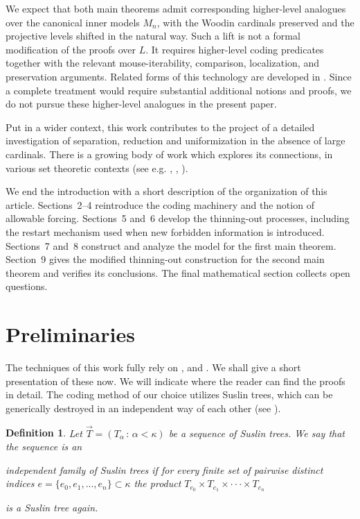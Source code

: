 \documentclass[a4paper,11pt]{article}
\newtheorem{definition}[theorem]{Definition}
\begin{document}
We expect that both main theorems admit corresponding higher-level analogues over the canonical inner models $M_n$, with the Woodin cardinals preserved and the projective levels shifted in the natural way. Such a lift is not a formal modification of the proofs over $L$. It requires higher-level coding predicates together with the relevant mouse-iterability, comparison, localization, and preservation arguments. Related forms of this technology are developed in \cite{Uniformization,DelfinoSigma,DelfinoPi}. Since a complete treatment would require substantial additional notions and proofs, we do not pursue these higher-level analogues in the present paper.

Put in a wider context, this work contributes to the project of a detailed investigation of separation, reduction and uniformization in the absence of large cardinals. There is a growing body of work which explores its connections, in various set theoretic contexts (see e.g. \cite{Separation without reduction}, \cite{Forcing axioms and uniformization}, \cite{MA and failure of separation}). 


We end the introduction with a short description of the organization of this article. Sections~2--4 reintroduce the coding machinery and the notion of allowable forcing. Sections~5 and~6 develop the thinning-out processes, including the restart mechanism used when new forbidden information is introduced. Sections~7 and~8 construct and analyze the model for the first main theorem. Section~9 gives the modified thinning-out construction for the second main theorem and verifies its conclusions. The final mathematical section collects open questions.

    \section{Preliminaries}
    
    The techniques of this work fully rely on \cite{Reduction}, \cite{Uniformization} and \cite{Separation without reduction}. We shall give a short presentation of these now. We will indicate where the reader can find the proofs in detail.
    The coding method of our choice utilizes Suslin trees, which can be generically destroyed in an independent way of each other (see \cite{NS saturated and definable}). 
    
    \begin{definition}
    
     Let $\vec{T} = (T_{\alpha} \, : \, \alpha < \kappa)$ be a sequence of Suslin trees. We say that the sequence is an 
    
     independent family of Suslin trees if for every finite set of pairwise distinct indices $e= \{e_0, e_1,...,e_n\} \subset \kappa$ the product $T_{e_0} \times T_{e_1} \times \cdot \cdot \cdot \times T_{e_n}$ 
    
     is a Suslin tree again.
    
    \end{definition}
    
\end{document}
